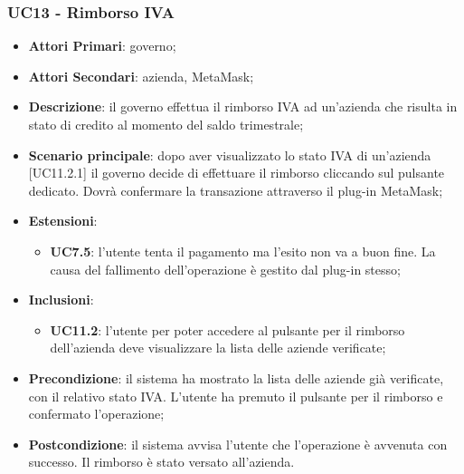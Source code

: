 \subsubsection{UC13 - Rimborso IVA}
\begin{itemize}
	\item \textbf{Attori Primari}:
	governo;
	\item \textbf{Attori Secondari}:
	azienda, MetaMask\glo;
	\item \textbf{Descrizione}: il governo effettua il rimborso IVA ad un'azienda che risulta in stato di credito al momento del saldo trimestrale;
	\item \textbf{Scenario principale}: dopo aver visualizzato lo stato IVA di un'azienda [UC11.2.1] il governo decide di effettuare il rimborso cliccando sul pulsante dedicato. Dovrà confermare la transazione attraverso il plug-in MetaMask\glo;
	\item \textbf{Estensioni}: 
	\begin{itemize}
		\item \textbf{UC7.5}: l'utente tenta il pagamento ma l'esito non va a buon fine. La causa del fallimento dell'operazione è gestito dal plug-in stesso;
	\end{itemize}
	\item \textbf{Inclusioni}: 
	\begin{itemize}
		\item \textbf{UC11.2}: l'utente per poter accedere al pulsante per il rimborso dell'azienda deve visualizzare la lista delle aziende verificate;
	\end{itemize}
	\item \textbf{Precondizione}: il sistema ha mostrato la lista delle aziende già verificate, con il relativo stato IVA. L'utente ha premuto il pulsante per il rimborso e confermato l'operazione;
	\item \textbf{Postcondizione}: il sistema avvisa l'utente che l'operazione è avvenuta con successo. Il rimborso è stato versato all'azienda.
\end{itemize} 
